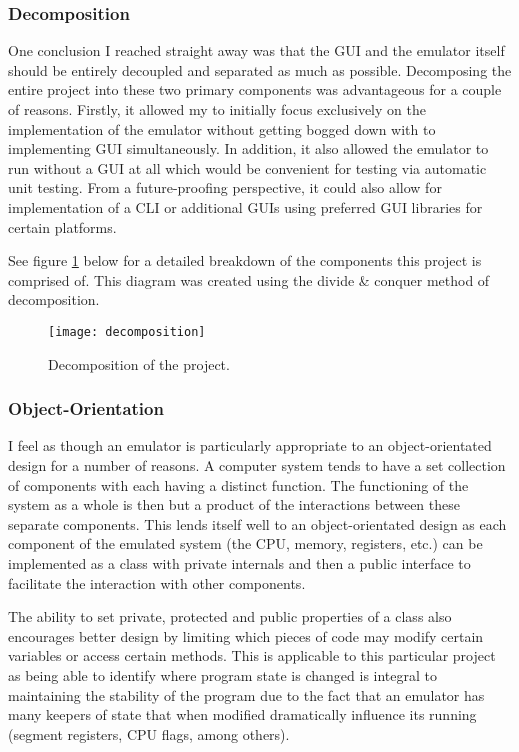     \subsubsection{Decomposition}
        One conclusion I reached straight away was that the GUI and the emulator itself should be entirely decoupled and separated as much as possible. Decomposing the entire project into these two primary components was advantageous for a couple of reasons. Firstly, it allowed my to initially focus exclusively on the implementation of the emulator without getting bogged down with to implementing GUI simultaneously. In addition, it also allowed the emulator to run without a GUI at all which would be convenient for testing via automatic unit testing. From a future-proofing perspective, it could also allow for implementation of a CLI or additional GUIs using preferred GUI libraries for certain platforms.

        See figure \ref{fig:decomp} below for a detailed breakdown of the components this project is comprised of. This diagram was created using the divide \& conquer method of decomposition.

        \begin{figure}[ht]
            \centering
            \texttt{[image: decomposition]}
            \caption{Decomposition of the project.}
            \label{fig:decomp}
        \end{figure}

    \subsubsection{Object-Orientation}
        I feel as though an emulator is particularly appropriate to an object-orientated design for a number of reasons. A computer system tends to have a set collection of components with each having a distinct function. The functioning of the system as a whole is then but a product of the interactions between these separate components. This lends itself well to an object-orientated design as each component of the emulated system (the CPU, memory, registers, etc.) can be implemented as a class with private internals and then a public interface to facilitate the interaction with other components.

        The ability to set private, protected and public properties of a class also encourages better design by limiting which pieces of code may modify certain variables or access certain methods. This is applicable to this particular project as being able to identify where program state is changed is integral to maintaining the stability of the program due to the fact that an emulator has many keepers of state that when modified dramatically influence its running (segment registers, CPU flags, among others).

